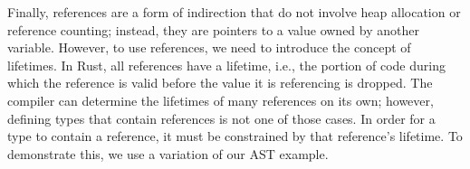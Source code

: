 \documentclass[12pt, letterpaper]{article}
\begin{document}
Finally, references are a form of indirection that do not involve heap allocation or reference counting; instead, they are pointers to a value owned by another variable. However, to use references, we need to introduce the concept of lifetimes. In Rust, all references have a lifetime, i.e., the portion of code during which the reference is valid before the value it is referencing is dropped. The compiler can determine the lifetimes of many references on its own; however, defining types that contain references is not one of those cases. In order for a type to contain a reference, it must be constrained by that reference's lifetime.\autocites[\href{https://doc.rust-lang.org/book/ch04-02-references-and-borrowing.html}{chap.~4~\S~2}]{rust-book}[\href{https://doc.rust-lang.org/book/ch10-03-lifetime-syntax.html}{chap.~10~\S~3}]{rust-book} To demonstrate this, we use a variation of our AST example.
\end{document}
